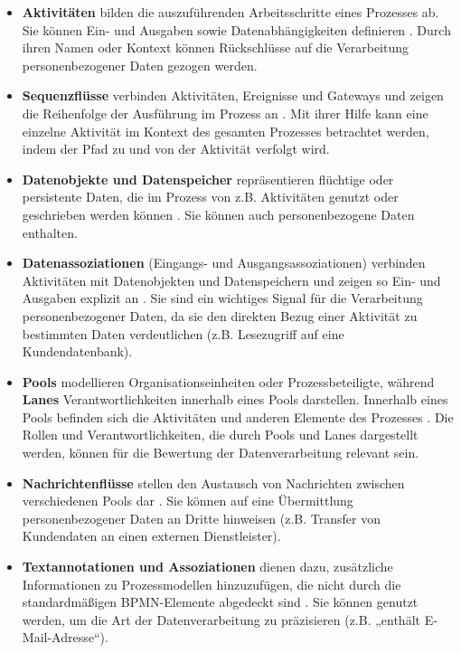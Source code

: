 \begin{itemize}
    \item \textbf{Aktivitäten} bilden die auszuführenden Arbeitsschritte eines Prozesses ab. Sie können Ein- und Ausgaben sowie Datenabhängigkeiten definieren \cite{omgbpmn}. Durch ihren Namen oder Kontext können Rückschlüsse auf die Verarbeitung personenbezogener Daten gezogen werden.
    \item \textbf{Sequenzflüsse} verbinden Aktivitäten, Ereignisse und Gateways und zeigen die Reihenfolge der Ausführung im Prozess an \cite{omgbpmn}. Mit ihrer Hilfe kann eine einzelne Aktivität im Kontext des gesamten Prozesses betrachtet werden, indem der Pfad zu und von der Aktivität verfolgt wird.
    \item \textbf{Datenobjekte und Datenspeicher} repräsentieren flüchtige oder persistente Daten, die im Prozess von z.B. Aktivitäten genutzt oder geschrieben werden können \cite{omgbpmn}. Sie können auch personenbezogene Daten enthalten.
    \item \textbf{Datenassoziationen} (Eingangs- und Ausgangsassoziationen) verbinden Aktivitäten mit Datenobjekten und Datenspeichern und zeigen so Ein- und Ausgaben explizit an \cite{omgbpmn}. Sie sind ein wichtiges Signal für die Verarbeitung personenbezogener Daten, da sie den direkten Bezug einer Aktivität zu bestimmten Daten verdeutlichen (z.B. Lesezugriff auf eine Kundendatenbank).
    \item \textbf{Pools} modellieren Organisationseinheiten oder Prozessbeteiligte, während \textbf{Lanes} Verantwortlichkeiten innerhalb eines Pools darstellen. Innerhalb eines Pools befinden sich die Aktivitäten und anderen Elemente des Prozesses \cite{omgbpmn}. Die Rollen und Verantwortlichkeiten, die durch Pools und Lanes dargestellt werden, können für die Bewertung der Datenverarbeitung relevant sein.
    \item \textbf{Nachrichtenflüsse} stellen den Austausch von Nachrichten zwischen verschiedenen Pools dar \cite{omgbpmn}. Sie können auf eine Übermittlung personenbezogener Daten an Dritte hinweisen (z.B. Transfer von Kundendaten an einen externen Dienstleister).
    \item \textbf{Textannotationen und Assoziationen} dienen dazu, zusätzliche Informationen zu Prozessmodellen hinzuzufügen, die nicht durch die standardmäßigen BPMN-Elemente abgedeckt sind \cite{omgbpmn}. Sie können genutzt werden, um die Art der Datenverarbeitung zu präzisieren (z.B. „enthält E-Mail-Adresse“).
\end{itemize}


